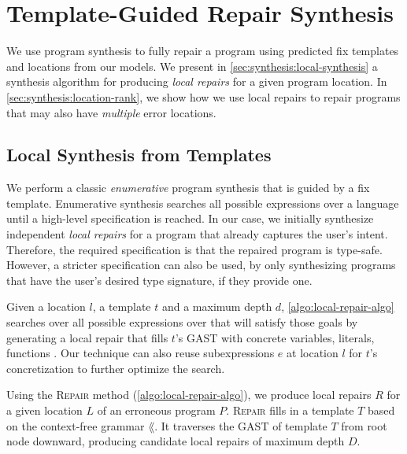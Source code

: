 \section{Template-Guided Repair Synthesis}
\label{sec:synthesis}
We use program synthesis to fully repair a program using predicted fix templates
and locations from our models. We present in
\autoref{sec:synthesis:local-synthesis} a synthesis algorithm for producing
\emph{local repairs} for a given program location. In
\autoref{sec:synthesis:location-rank}, we show how we use local repairs to
repair programs that may also have \emph{multiple} error locations.

\lstMakeShortInline[mathescape=true]{|}

\subsection{Local Synthesis from Templates}
\label{sec:synthesis:local-synthesis}

We perform a classic \emph{enumerative} program synthesis that is guided by a
fix template. Enumerative synthesis searches all possible expressions over a
language until a high-level specification is reached. In our case, we initially
synthesize independent \emph{local repairs} for a program that already captures
the user's intent. Therefore, the required specification is that the repaired
program is type-safe. However, a stricter specification can also be used, by
only synthesizing programs that have the user's desired type signature, if
they provide one.

Given a location $l$, a template $t$ and a maximum depth $d$,
\autoref{algo:local-repair-algo} searches over all possible expressions over
\lang that will satisfy those goals by generating a local repair that fills
$t$'s GAST with concrete variables, literals, functions \etc. Our technique can
also reuse subexpressions $e$ at location $l$ for $t$'s concretization to
further optimize the search.



Using the \textsc{Repair} method (\autoref{algo:local-repair-algo}), we produce
local repairs $R$ for a given location $L$ of an erroneous program $P$.
\textsc{Repair} fills in a template $T$ based on the context-free grammar
$\lang$. It traverses the GAST of template $T$ from root node
downward, producing candidate local repairs of maximum depth $D$.

